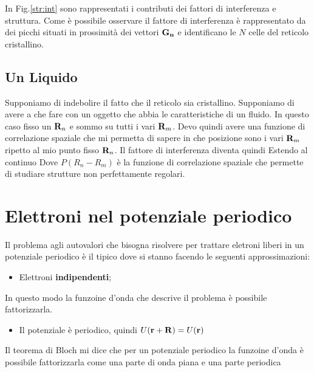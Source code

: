 \documentclass[a4paper,12pt]{article}
\begin{document}
In Fig.\ref{str:int} sono rappresentati i contributi dei fattori di interferenza e struttura. Come è possibile osservare il fattore di interferenza è rappresentato da dei picchi situati in prossimità dei vettori $ {\it\bf G_n}$ e identificano le $N$ celle del reticolo cristallino.
\subsection{Un Liquido}
Supponiamo di indebolire il fatto che il reticolo sia cristallino. Supponiamo di avere a che fare con un oggetto che abbia le caratteristiche di un fluido. In questo caso fisso un ${\it\bf R} _n$ e sommo su tutti i vari ${\it\bf R} _m$. Devo quindi avere una funzione di correlazione spaziale che mi permetta di sapere in che posizione sono i vari ${\it\bf R} _m$ ripetto al mio punto fisso ${\it\bf R} _n$. Il fattore di interferenza diventa quindi 
Estendo al continuo
Dove $P(R_n-R_m)$ è la funzione di correlazione spaziale che permette di studiare strutture non perfettamente regolari.

\section{Elettroni nel potenziale periodico}
Il problema agli autovalori che bisogna risolvere per trattare eletroni liberi in un potenziale periodico è il tipico
dove si stanno facendo le seguenti approssimazioni:
\begin{itemize}
	\item Elettroni \textbf{indipendenti};
\end{itemize}
In questo modo la funzoine d'onda che descrive il problema è possibile fattorizzarla.
\begin{itemize}
	\item Il potenziale è periodico, quindi $U({\it\bf r}  + {\it\bf R} )  = U({\it\bf r}  )$
\end{itemize}
Il teorema di Bloch mi dice che per un potenziale periodico la funzoine d'onda è possibile fattorizzarla come una parte di onda piana e una parte periodica
\end{document}
